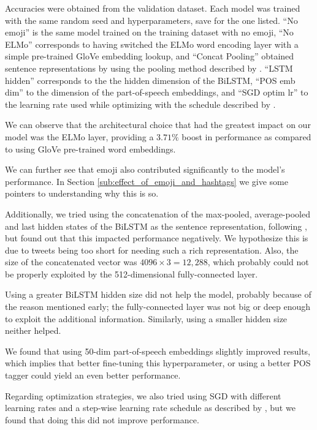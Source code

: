 \documentclass[11pt,a4paper]{article}
\begin{document}
Accuracies were obtained from the
validation dataset. Each model was trained with the same random seed and hyperparameters, save for the one listed. ``No emoji'' is the same model trained on the training dataset with no emoji, ``No ELMo'' corresponds to having switched the ELMo word encoding layer with a simple pre-trained GloVe embedding lookup, and ``Concat Pooling'' obtained sentence representations by using the pooling method described by \citet{howard2018universal}. ``LSTM hidden'' corresponds to the the hidden dimension of the BiLSTM, ``POS emb dim'' to the dimension of the part-of-speech embeddings, and ``SGD optim lr'' to the learning rate used while optimizing with the schedule described by \citet{conneau2017supervised}.

We can observe that the architectural choice that had the greatest impact on our model was the ELMo layer, providing a $3.71\%$ boost in performance as compared to using GloVe pre-trained word embeddings.

We can further see that emoji also contributed significantly to the model's performance. In Section \ref{sub:effect_of_emoji_and_hashtags} we give some pointers to understanding why this is so.  

Additionally, we tried using the concatenation of the max-pooled, average-pooled and last hidden states of the BiLSTM as the sentence representation, following \citet{howard2018universal}, but found out that this impacted performance negatively. We hypothesize this is due to tweets being too short for needing such a rich representation. Also, the size of the concatenated vector was $4096\times3=12,288$, which probably could not be properly exploited by the 512-dimensional fully-connected layer.

Using a greater BiLSTM hidden size did not help the model, probably because of the reason mentioned early; the fully-connected layer was not big or deep enough to exploit the additional information. Similarly, using a smaller hidden size neither helped.

We found that using 50-dim part-of-speech embeddings slightly improved results, which implies that better fine-tuning this hyperparameter, or using a better POS tagger could yield an even better performance.

Regarding optimization strategies, we also tried using SGD with different learning rates and a step-wise learning rate schedule as described by \citet{conneau2018}, but we found that doing this did not improve performance. 
\end{document}
